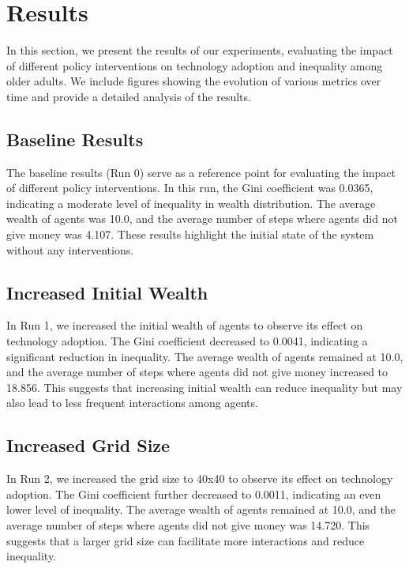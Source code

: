 \documentclass{article} %
\begin{document}

\section{Results}
\label{sec:results}

In this section, we present the results of our experiments, evaluating the impact of different policy interventions on technology adoption and inequality among older adults. We include figures showing the evolution of various metrics over time and provide a detailed analysis of the results.

\subsection{Baseline Results}
The baseline results (Run 0) serve as a reference point for evaluating the impact of different policy interventions. In this run, the Gini coefficient was 0.0365, indicating a moderate level of inequality in wealth distribution. The average wealth of agents was 10.0, and the average number of steps where agents did not give money was 4.107. These results highlight the initial state of the system without any interventions.

\subsection{Increased Initial Wealth}
In Run 1, we increased the initial wealth of agents to observe its effect on technology adoption. The Gini coefficient decreased to 0.0041, indicating a significant reduction in inequality. The average wealth of agents remained at 10.0, and the average number of steps where agents did not give money increased to 18.856. This suggests that increasing initial wealth can reduce inequality but may also lead to less frequent interactions among agents.

\subsection{Increased Grid Size}
In Run 2, we increased the grid size to 40x40 to observe its effect on technology adoption. The Gini coefficient further decreased to 0.0011, indicating an even lower level of inequality. The average wealth of agents remained at 10.0, and the average number of steps where agents did not give money was 14.720. This suggests that a larger grid size can facilitate more interactions and reduce inequality.
\end{document}
